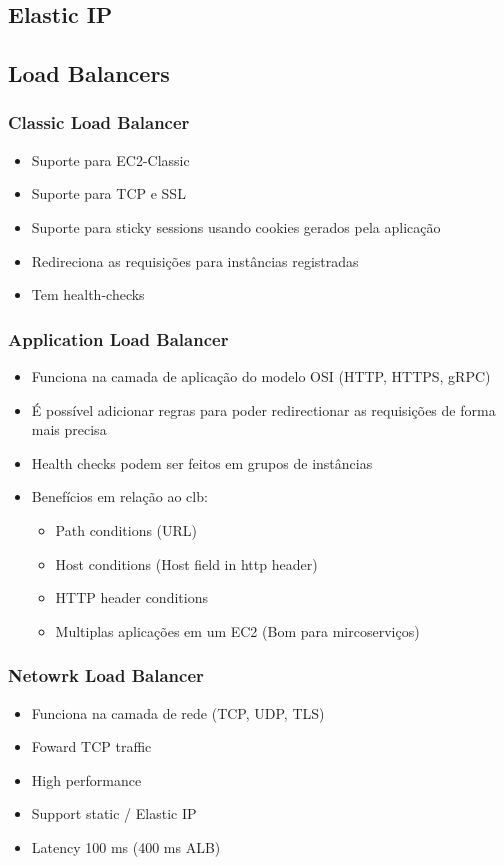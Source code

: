 \subsection{Elastic IP}

\subsection{Load Balancers}

\begin{frame}
	\frametitle{Classic Load Balancer}
	\begin{itemize}
		\item Suporte para EC2-Classic
		\item Suporte para TCP e SSL
		\item Suporte para sticky sessions usando cookies gerados pela aplicação
		\item Redireciona as requisições para instâncias registradas
		\item Tem health-checks
	\end{itemize}
\end{frame}

\begin{frame}
	\frametitle{Application Load Balancer}
	\begin{itemize}
		\item Funciona na camada de aplicação do modelo OSI (HTTP, HTTPS, gRPC)
		\item É possível adicionar regras para poder redirectionar as requisições de forma mais precisa
		\item Health checks podem ser feitos em grupos de instâncias
		\item Benefícios em relação ao clb:
			\begin{itemize}
				\item Path conditions (URL)
				\item Host conditions (Host field in http header)
				\item HTTP header conditions
				\item Multiplas aplicações em um EC2 (Bom para mircoserviços)
			\end{itemize}
	\end{itemize}
\end{frame}

\begin{frame}
	\frametitle{Netowrk Load Balancer}
	\begin{itemize}
		\item Funciona na camada de rede (TCP, UDP, TLS)
		\item Foward TCP traffic
		\item High performance
		\item Support static / Elastic IP
		\item Latency 100 ms (400 ms ALB)
	\end{itemize}
\end{frame}

